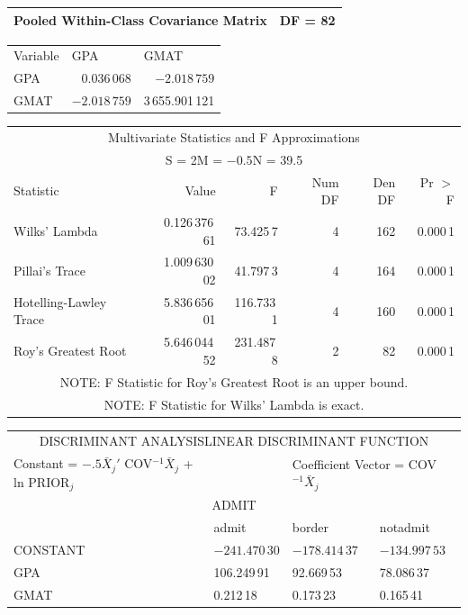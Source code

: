 \begin{mvbox}
{\begin{center}
\begin{tabular}{|l|l|@{}}
\hline
Pooled Within-Class Covariance Matrix & DF = 82\\
\hline
\end{tabular}
\end{center}

\begin{center}
\begin{tabular}{@{}lll@{}}
Variable & GPA & GMAT\\[2pt]
GPA & \multicolumn{1}{|r}{0.036\,068} & \multicolumn{1}{r|}{$-2.018\,759$}\\
GMAT & \multicolumn{1}{|r}{$-2.018\,759$} & \multicolumn{1}{r|}{3\,655.901\,121}\\
\end{tabular}
\end{center}

\begin{center}
\begin{tabular}{@{}lrrrrr@{}}
\multicolumn{6}{c}{Multivariate Statistics and F Approximations}\\
\multicolumn{6}{c}{S = 2\qquad M = $-0.5$\qquad N = 39.5}\\
Statistic & Value & F & Num DF & Den DF & Pr $>$ F\\
Wilks' Lambda & 0.126\,376\,61 & 73.425\,7 & 4 & 162 & 0.000\,1\\
Pillai's Trace & 1.009\,630\,02 & 41.797\,3 & 4 & 164 & 0.000\,1\\
Hotelling-Lawley Trace & 5.836\,656\,01 & 116.733\,1 & 4 & 160 & 0.000\,1\\
Roy's Greatest Root & 5.646\,044\,52 & 231.487\,8 & 2 & 82 & 0.000\,1\\
\multicolumn{6}{c}{NOTE: F Statistic for Roy's Greatest Root is an upper bound.}\\
\multicolumn{6}{c}{NOTE: F Statistic for Wilks' Lambda is exact.}\\
\end{tabular}
\end{center}

\begin{center}
\begin{tabular}{@{}llll@{}}
\multicolumn{4}{c}{DISCRIMINANT ANALYSIS\quad LINEAR DISCRIMINANT FUNCTION}\\
Constant = $-.5\bar{X}_j'$ COV$^{-1}\bar{X}_j$ + ln PRIOR$_j$ & & \multicolumn{2}{l}{Coefficient Vector = COV$^{-1}\bar{X}_j$}\\
\multicolumn{4}{c}{ADMIT}\\
& admit & border & notadmit\\
CONSTANT & $-241.470\,30$ & $-178.414\,37$ & $-134.997\,53$\\
GPA & 106.249\,91 & 92.669\,53 & 78.086\,37\\
GMAT & 0.212\,18 & 0.173\,23 & 0.165\,41\\
\end{tabular}
\end{center}

}
\end{mvbox}
